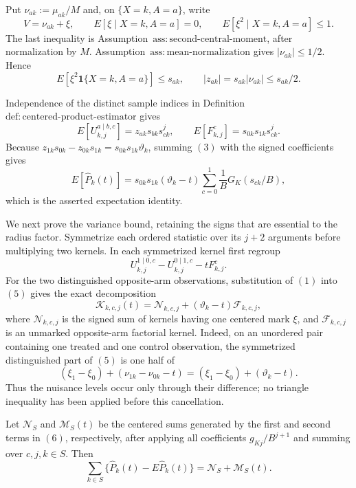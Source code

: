 Put \(\nu_{ak}:=\mu_{ak}/M\) and, on \(\{X=k,A=a\}\), write
\[
 V=\nu_{ak}+\xi,
 \qquad E[\xi\mid X=k,A=a]=0,
 \qquad E[\xi^2\mid X=k,A=a]\le1.
\tag{1}
\]
The last inequality is Assumption~\(\mathrm{ass:second\text{-}central\text{-}moment}\), after normalization by \(M\).  Assumption~\(\mathrm{ass:mean\text{-}normalization}\) gives \(|\nu_{ak}|\le1/2\).  Hence
\[
 E[\xi^2\mathbf 1\{X=k,A=a\}]\le s_{ak},
 \qquad |z_{ak}|=s_{ak}|\nu_{ak}|\le s_{ak}/2.
\tag{2}
\]

Independence of the distinct sample indices in Definition~\(\mathrm{def:centered\text{-}product\text{-}estimator}\) gives
\[
 E[U_{k,j}^{a\mid b,c}]=z_{ak}s_{bk}s_{ck}^{j},
 \qquad E[F_{k,j}^{c}]=s_{0k}s_{1k}s_{ck}^{j}.
\tag{3}
\]
Because \(z_{1k}s_{0k}-z_{0k}s_{1k}=s_{0k}s_{1k}\vartheta_k\), summing \((3)\) with the signed coefficients gives
\[
 E[\widehat P_k(t)]
 =s_{0k}s_{1k}(\vartheta_k-t)
 \sum_{c=0}^1\frac1B G_K(s_{ck}/B),
\tag{4}
\]
which is the asserted expectation identity.

We next prove the variance bound, retaining the signs that are essential to the radius factor.  Symmetrize each ordered statistic over its \(j+2\) arguments before multiplying two kernels.  In each symmetrized kernel first regroup
\[
 U_{k,j}^{1\mid0,c}-U_{k,j}^{0\mid1,c}-tF_{k,j}^{c}.
\tag{5}
\]
For the two distinguished opposite-arm observations, substitution of \((1)\) into \((5)\) gives the exact decomposition
\[
 \mathcal K_{k,c,j}(t)
 =\mathcal N_{k,c,j}+(\vartheta_k-t)\mathcal F_{k,c,j},
\tag{6}
\]
where \(\mathcal N_{k,c,j}\) is the signed sum of kernels having one centered mark \(\xi\), and \(\mathcal F_{k,c,j}\) is an unmarked opposite-arm factorial kernel.  Indeed, on an unordered pair containing one treated and one control observation, the symmetrized distinguished part of \((5)\) is one half of
\[
 (\xi_1-\xi_0)+(\nu_{1k}-\nu_{0k}-t)
 = (\xi_1-\xi_0)+(\vartheta_k-t).
\]
Thus the nuisance levels occur only through their difference; no triangle inequality has been applied before this cancellation.

Let \(\mathcal N_S\) and \(\mathcal M_S(t)\) be the centered sums generated by the first and second terms in \((6)\), respectively, after applying all coefficients \(g_{Kj}/B^{j+1}\) and summing over \(c,j,k\in S\).  Then
\[
 \sum_{k\in S}\{\widehat P_k(t)-E\widehat P_k(t)\}
 =\mathcal N_S+\mathcal M_S(t).
\tag{7}
\]

